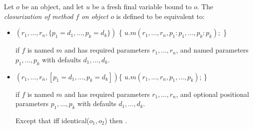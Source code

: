 \documentclass{article}
\newcommand{\code}[1]{{\sf #1}}
\begin{document}
\LMHash{}
Let $o$ be an object, and let $u$ be a fresh final variable bound to $o$.
The {\em closurization of method $f$ on object $o$} is defined to be equivalent to:
\begin{itemize}
\item
\begin{dartCode}
$(r_1, \ldots, r_n, \{p_1 = d_1, \ldots , p_k = d_k\})$ \{
  \RETURN{} $ u.m(r_1, \ldots, r_n, p_1: p_1, \ldots, p_k: p_k);$
\}
\end{dartCode}
if $f$ is named $m$ and has required parameters $r_1, \ldots, r_n$, and named parameters $p_1, \ldots, p_k$ with defaults $d_1, \ldots, d_k$.
\item
\begin{dartCode}
$(r_1, \ldots, r_n, [p_1 = d_1, \ldots , p_k = d_k])$\{
  \RETURN{} $u.m(r_1, \ldots, r_n, p_1, \ldots, p_k)$;
\}
\end{dartCode}
if $f$ is named $m$ and has required parameters $r_1, \ldots, r_n$, and optional positional parameters $p_1, \ldots, p_k$ with defaults $d_1, \ldots, d_k$.

\LMHash{}
Except that iff  \code{identical($o_1, o_2$)}  then .




\end{itemize}
\end{document}
